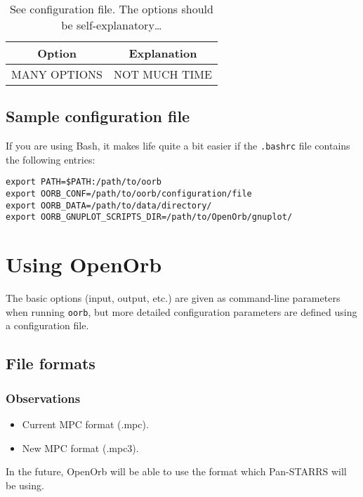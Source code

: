 \documentclass[12pt,english,twoside,a4paper]{report}
\begin{document}
\begin{table}\label{table:conf}
\centering
\begin{tabular}{cc}
\hline
Option & Explanation \\
\hline
MANY OPTIONS & NOT MUCH TIME \\
\hline
\end{tabular}
\caption{See configuration file. The options should be self-explanatory\ldots}  
\end{table}



\section{Sample configuration file}

If you are using Bash, it makes life quite a bit easier if the
\verb|.bashrc| file contains the following entries:
\begin{verbatim}
export PATH=$PATH:/path/to/oorb
export OORB_CONF=/path/to/oorb/configuration/file
export OORB_DATA=/path/to/data/directory/
export OORB_GNUPLOT_SCRIPTS_DIR=/path/to/OpenOrb/gnuplot/
\end{verbatim}



\chapter{Using OpenOrb}

The basic options (input, output, etc.) are given as command-line
parameters when running \verb|oorb|, but more detailed configuration
parameters are defined using a configuration file.

\section{File formats}

\subsection{Observations}

\begin{itemize}

\item Current MPC format (.mpc).
\item New MPC format (.mpc3).

\end{itemize}

In the future, OpenOrb will be able to use the format which Pan-STARRS
will be using.
\end{document}
